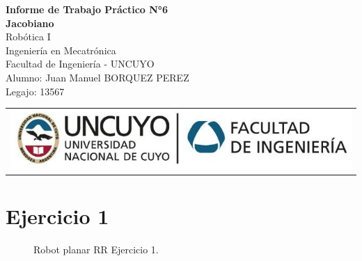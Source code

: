 \documentclass[a4paper,12pt]{article}
\begin{document}
\begin{titlepage}
    \centering
    \vspace*{5cm}
    {\Huge\bfseries Informe de Trabajo Práctico N°6}\\
    \vspace{0.2cm}
    {\Large \textbf{Jacobiano}}\\
    \vspace{0.5cm}
    {\Large Robótica I}\\
    \vspace{0.5 cm}
    {\Large Ingeniería en Mecatrónica}\\
    \vspace{0.2 cm}
    {\Large Facultad de Ingeniería - UNCUYO}\\
    \vspace{1.5cm}
    Alumno: Juan Manuel BORQUEZ PEREZ\\
    Legajo: 13567\\
    \vfill
    {\begin{tabular}{@{}c@{}}\includegraphics[scale=0.4]{escudo.PNG}\end{tabular}}\hspace{10pt}
\end{titlepage}

\section{Ejercicio 1}
\begin{figure}[H]
    \centering
    \begin{adjustbox}{scale = 0.55, max width=\columnwidth}
    \end{adjustbox}
    \caption{Robot planar RR Ejercicio 1.}
\end{figure}
\end{document}
